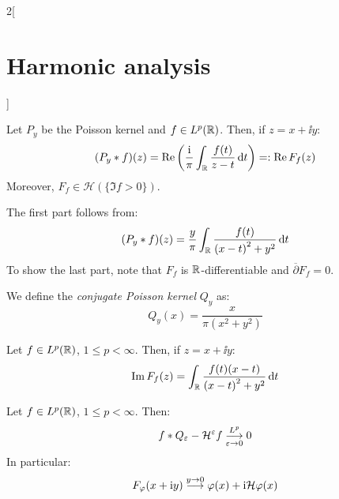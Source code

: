 \documentclass[../../../main_math.tex]{subfiles}
\begin{document}
\begin{multicols}{2}[\section{Harmonic analysis}]
  \begin{lemma}
    Let $P_y$ be the Poisson kernel and $f\in L^p(\mathbb{R})$. Then, if $z=x+\ii y$:
    $$
      (P_y*f)(z)=\Re\left(\frac{\mathrm{i}}{\pi}\int_{\mathbb{R}}\frac{f(t)}{z-t}\dd{t}\right)=:\Re F_f(z)
    $$
    Moreover, $F_f\in\mathcal{H}(\{\Im f>0\})$.
  \end{lemma}
  \begin{sproof}
    The first part follows from:
    $$
      (P_y*f)(z)=\frac{y}{\pi}\int_{\mathbb{R}}\frac{f(t)}{{(x-t)}^2+y^2}\dd{t}
    $$
    To show the last part, note that $F_f$ is $\mathbb{R}$-differentiable and $\overline{\partial}F_f=0$.
  \end{sproof}
  \begin{definition}
    We define the \emph{conjugate Poisson kernel} $Q_y$ as:
    $$
      Q_y(x)=\frac{x}{\pi(x^2+y^2)}
    $$
  \end{definition}
  \begin{lemma}
    Let $f\in L^p(\mathbb{R})$, $1\leq p <\infty$. Then, if $z=x+\ii y$:
    $$
      \Im F_f(z) =\int_{\mathbb{R}} \frac{f(t)(x-t)}{{(x-t)}^2+y^2}\dd{t}
    $$
  \end{lemma}
  \begin{theorem}
    Let $f\in L^p(\mathbb{R})$, $1\leq p <\infty$. Then:
    $$
      f*Q_\varepsilon -\mathcal{H}^\varepsilon f\overset{L^p}{\underset{\varepsilon\to 0}{\longrightarrow}} 0
    $$
    In particular:
    $$
      F_\varphi(x+\mathrm{i} y) \overset{y\to 0}{\longrightarrow} \varphi(x) + \mathrm{i} \mathcal{H} \varphi(x)
    $$
  \end{theorem}

\end{multicols}
\end{document}
